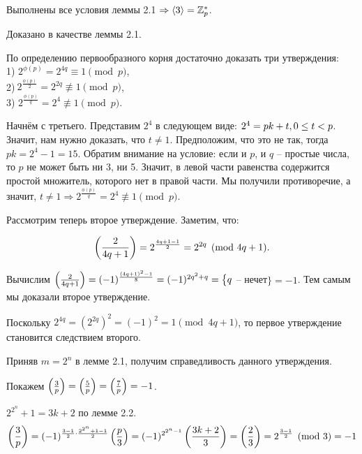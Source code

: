 \documentclass[a4paper,11pt,openany]{book}
\begin{document}
Выполнены все условия леммы 2.1 $\Rightarrow \langle 3 \rangle = \mathbb{Z}^*_p$.


Доказано в качестве леммы 2.1.


По определению первообразного корня достаточно доказать три утверждения: \\ 1) $2^{\phi(p)} = 2^{4q} \equiv 1 \pmod p$,\\ 2)$\ 2^{\frac{\phi(p)}{2}} =  2^{2q} \not \equiv 1 \pmod p$, \\ 3) $2^{\frac{\phi(p)}{q}} =  2^{4} \not \equiv 1 \pmod p$.

Начнём с третьего. Представим $2^4$ в следующем виде: $2^4 = pk + t, \\ 0 \le t < p$. Значит, нам нужно доказать, что $t \ne 1$. Предположим, что это не так, тогда $pk = 2^4 - 1 = 15$. Обратим внимание на условие: если и $p$, и $q$ -- простые числа, то $p$ не может быть ни 3, ни 5. Значит, в левой части равенства содержится простой множитель, которого нет в правой части. Мы получили противоречие, а значит, $t \ne 1 \Rightarrow 2^{\frac{\phi(p)}{q}} =  2^{4} \not \equiv 1 \pmod p$.

Рассмотрим теперь второе утверждение. Заметим, что:

$$\left( \frac{2}{4q + 1} \right) = 2 ^ {\frac{4q + 1 - 1}{2}} = 2 ^ {2q} \pmod {4q + 1}.$$

Вычислим $\left( \frac{2}{4q+1} \right) = (-1) ^ {\frac{(4q+1)^2 - 1}{8}} = (-1)^{2q^2 + q} = \big\{q$ -- нечет$\big\} = -1$. Тем самым мы доказали второе утверждение.

Поскольку $2^{4q} = (2^{2q})^2 = (-1)^2 = 1 \pmod {4q+1}$, то первое утверждение становится следствием второго.


Приняв $m = 2^n$ в лемме 2.1, получим справедливость данного утверждения.



Покажем $\left( \frac{3}{p} \right) = \left( \frac{5}{p} \right) = \left( \frac{7}{p} \right) = -1$.

$2^{2^n} + 1 = 3k + 2$ по лемме 2.2.
$$\left( \frac{3}{p} \right) = (-1) ^ {\frac{3 - 1}{2} \cdot \frac{2^{2^n} + 1 - 1}{2}} \left( \frac{p}{3} \right) = (-1) ^ {2^{2^n - 1}} \left( \frac{3k+2}{3} \right) = \left( \frac{2}{3} \right) = 2^{\frac{3-1}{2}} \pmod 3 = -1$$
\end{document}
